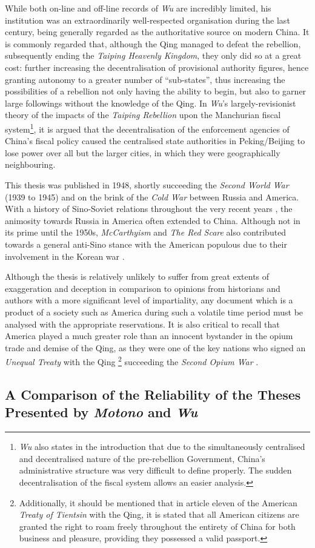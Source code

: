 \documentclass{article}
\begin{document}
        While both on-line and off-line records of \textit{Wu} are incredibly limited, his institution was an extraordinarily well-respected organisation during the last century, being generally regarded as the authoritative source on modern China. It is commonly regarded that, although the Qing managed to defeat the rebellion, subsequently ending the \textit{Taiping Heavenly Kingdom}, they only did so at a great cost: further increasing the decentralisation of provisional authority figures, hence granting autonomy to a greater number of ``sub-states'', thus increasing the possibilities of a rebellion not only having the ability to begin, but also to garner large followings without the knowledge of the Qing. In \textit{Wu}'s largely-revisionist theory of the impacts of the \textit{Taiping Rebellion} upon the Manchurian fiscal system\footnote{\textit{Wu} also states in the introduction that due to the simultaneously centralised and decentralised nature of the pre-rebellion Government, China's administrative structure was very difficult to define properly. The sudden decentralisation of the fiscal system allows an easier analysis.}, it is argued that the decentralisation of the enforcement agencies of China's fiscal policy caused the centralised state authorities in Peking/Beijing to lose power over all but the larger cities, in which they were geographically neighbouring.

        This thesis was published in 1948, shortly succeeding the \textit{Second World War} (1939 to 1945) and on the brink of the \textit{Cold War} between Russia and America. With a history of Sino-Soviet relations throughout the very recent years \autocite{Garver:1989}, the animosity towards Russia in America often extended to China. Although not in its prime until the 1950s, \textit{McCarthyism} and \textit{The Red Scare} also contributed towards a general anti-Sino stance with the American populous due to their involvement in the Korean war \autocite{Schrecker:1998}.

        Although the thesis is relatively unlikely to suffer from great extents of exaggeration and deception in comparison to opinions from historians and authors with a more significant level of impartiality, any document which is a product of a society such as America during such a volatile time period must be analysed with the appropriate reservations. It is also critical to recall that America played a much greater role than an innocent bystander in the opium trade and demise of the Qing, as they were one of the key nations who signed an \textit{Unequal Treaty} with the Qing \autocite{Peters:1961}\footnote{Additionally, it should be mentioned that in article eleven of the American \textit{Treaty of Tientsin} with the Qing, it is stated that all American citizens are granted the right to roam freely throughout the entirety of China for both business and pleasure, providing they possessed a valid passport.} succeeding the \textit{Second Opium War} \autocite{Johnstone:1937}.

\subsection{A Comparison of the Reliability of the Theses Presented by \textit{Motono} and \textit{Wu}}

\pagebreak
\printbibliography[title={Cited Works}, heading=bibintoc]
\end{document}
